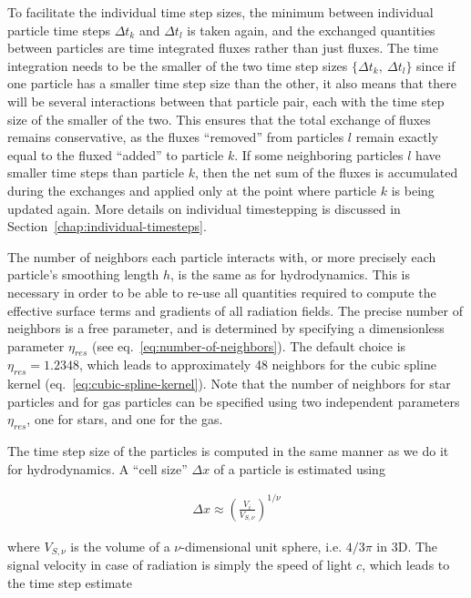 To facilitate the individual time step sizes, the minimum between individual particle time steps
$\Delta t_k$ and $\Delta t_l$ is taken again, and the exchanged quantities between particles are
time integrated fluxes rather than just fluxes. The time integration needs to be the smaller of the
two time step sizes $\{\Delta t_k,\  \Delta t_l\}$ since if one particle has a smaller time step
size than the other, it also means that there will be several interactions between that particle
pair, each with the time step size of the smaller of the two. This ensures that the total exchange
of fluxes remains conservative, as the fluxes ``removed'' from particles $l$ remain exactly equal
to the fluxed ``added'' to particle $k$. If some neighboring particles $l$ have smaller time steps
than particle $k$, then the net sum of the fluxes is accumulated during the exchanges and applied
only at the point where particle $k$ is being updated again. More details on individual
timestepping is discussed in Section~\ref{chap:individual-timesteps}.



The number of neighbors each particle interacts with, or more precisely each particle's smoothing
length $h$, is the same as for hydrodynamics. This is necessary in order to be able to re-use all
quantities required to compute the effective surface terms \Aij and gradients of all radiation
fields. The precise number of neighbors is a free parameter, and is determined by specifying a
dimensionless parameter $\eta_{res}$ (see eq.~\ref{eq:number-of-neighbors}). The default choice is
$\eta_{res} = 1.2348$, which leads to approximately 48 neighbors for the cubic spline kernel
(eq.~\ref{eq:cubic-spline-kernel}). Note that the number of neighbors for star particles and for gas
particles can be specified using two independent parameters $\eta_{res}$, one for stars, and one for
the gas.

The time step size of the particles is computed in the same manner as we do it for hydrodynamics.
A ``cell size'' $\Delta x$ of a particle is estimated using

\begin{align}
    \Delta x \approx \left(\frac{V_i}{V_{S,\nu}} \right)^{1/\nu}
\end{align}

where $V_{S,\nu}$ is the volume of a $\nu$-dimensional unit sphere, i.e. $4/3 \pi$ in 3D. The signal
velocity in case of radiation is simply the speed of light $c$, which leads to the time step
estimate

